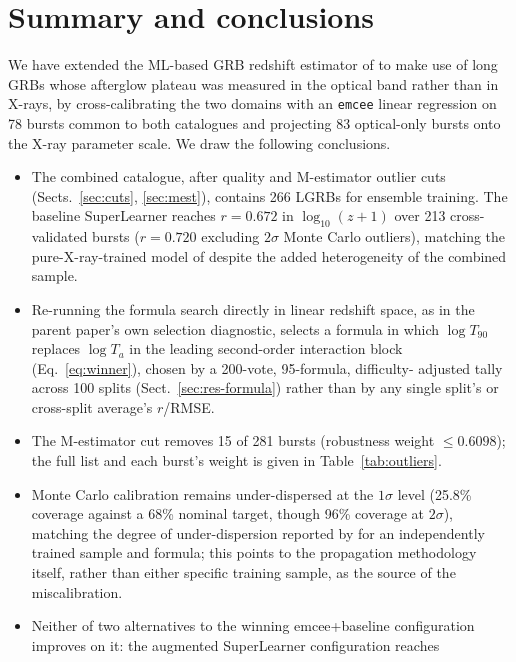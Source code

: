 \documentclass{aa}
\newcommand{\Ta}{T_a}
\newcommand{\logz}{\log_{10}(z+1)}
\begin{document}
\section{Summary and conclusions}
\label{sec:conclusions}

We have extended the ML-based GRB redshift estimator of \citet{narendra2025}
to make use of long GRBs whose afterglow plateau was measured in the optical
band rather than in X-rays, by cross-calibrating the two domains with an
\texttt{emcee} linear regression on 78 bursts common to both catalogues and
projecting 83 optical-only bursts onto the X-ray parameter scale. We draw the
following conclusions.

\begin{itemize}
\item The combined catalogue, after quality and M-estimator outlier cuts
  (Sects.~\ref{sec:cuts}, \ref{sec:mest}), contains 266 LGRBs for ensemble
  training. The baseline SuperLearner reaches $r=0.672$ in $\logz$ over 213
  cross-validated bursts ($r=0.720$ excluding $2\sigma$ Monte Carlo outliers),
  matching the pure-X-ray-trained model of \citet{narendra2025} despite the
  added heterogeneity of the combined sample.
\item Re-running the formula search directly in linear redshift space, as in
  the parent paper's own selection diagnostic, selects a formula in which
  $\log T_{90}$ replaces $\log \Ta$ in the leading second-order interaction
  block (Eq.~\ref{eq:winner}), chosen by a 200-vote, 95-formula, difficulty-
  adjusted tally across 100 splits (Sect.~\ref{sec:res-formula}) rather than
  by any single split's or cross-split average's $r$/RMSE.
\item The M-estimator cut removes 15 of 281 bursts (robustness weight
  $\leq0.6098$); the full list and each burst's weight is given in
  Table~\ref{tab:outliers}.
\item Monte Carlo calibration remains under-dispersed at the $1\sigma$ level
  (25.8\% coverage against a 68\% nominal target, though 96\% coverage at
  $2\sigma$), matching the degree of under-dispersion reported by
  \citet{narendra2025} for an independently trained sample and formula; this
  points to the propagation methodology itself, rather than either specific
  training sample, as the source of the miscalibration.
\item Neither of two alternatives to the winning emcee+baseline configuration
  improves on it: the augmented SuperLearner configuration reaches

\end{itemize}
\end{document}
